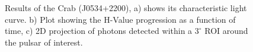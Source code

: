\documentclass{PoS}
\begin{document}
\begin{figure}
\centering
{}
{}
\caption{Results of the Crab (J0534+2200), a)  shows its characteristic  light curve. b) Plot showing the H-Value progression as a function of time, c) 2D projection of photons detected within a $ 3^{\circ}$ ROI around the pulsar of interest.}\label{crab}
\end{figure}
\end{document}
